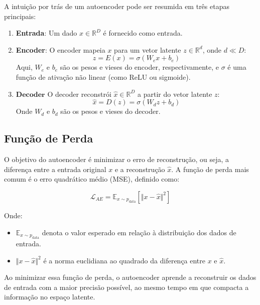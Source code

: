 \documentclass{article}
\begin{document}
A intuição por trás de um autoencoder pode ser resumida em três etapas principais:
\begin{enumerate}
    \item \textbf{Entrada}: Um dado $x \in \mathbb{R}^D$ é fornecido como entrada.
    \item \textbf{Encoder}: O encoder mapeia $x$ para um vetor latente $z \in \mathbb{R}^d$, onde $d \ll D$:
   \begin{equation}
       z = E(x) = \sigma(W_e x + b_e)
   \end{equation}
   Aqui, $W_e$ e $b_e$ são os pesos e vieses do encoder, respectivamente, e $\sigma$ é uma função de ativação não linear (como ReLU ou sigmoide).
   \item $\mathbf{Decoder}$ O decoder reconstrói $\hat{x} \in \mathbb{R}^D$ a partir do vetor latente $z$:
   \begin{equation}
       \hat{x} = D(z) = \sigma(W_d z + b_d)
   \end{equation}
   Onde $W_d$ e $b_d$ são os pesos e vieses do decoder.
\end{enumerate}

\subsection{Função de Perda}

O objetivo do autoencoder é minimizar o erro de reconstrução, ou seja, a diferença entre a entrada original $x$ e a reconstrução $\hat{x}$. A função de perda mais comum é o erro quadrático médio (MSE), definido como:

\begin{equation}
    \mathcal{L}_{AE} = \mathbb{E}_{x \sim p_{\text{data}}} \left[ \Vert x - \hat{x} \Vert^2 \right]
\end{equation}

Onde:
\begin{itemize}
    \item $\mathbb{E}_{x \sim p_{\text{data}}}$ denota o valor esperado em relação à distribuição dos dados de entrada.
    \item $\Vert x - \hat{x} \Vert^2$ é a norma euclidiana ao quadrado da diferença entre $x$ e $\hat{x}$.
\end{itemize}


Ao minimizar essa função de perda, o autoencoder aprende a reconstruir os dados de entrada com a maior precisão possível, ao mesmo tempo em que compacta a informação no espaço latente.
\end{document}
